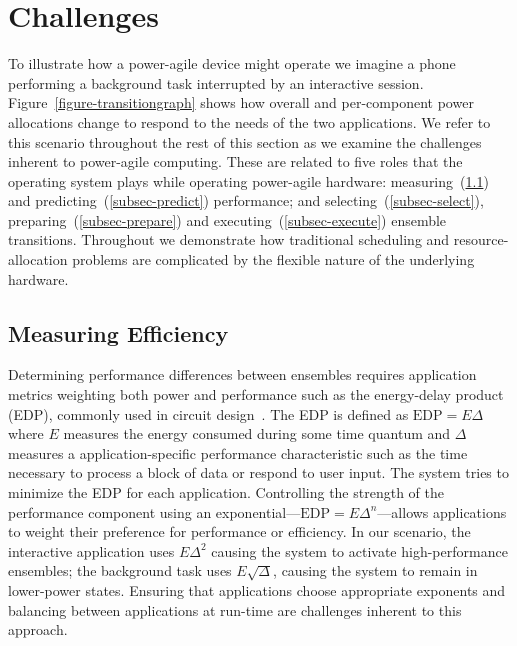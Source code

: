 \section{Challenges}
\label{sec-challenges}



To illustrate how a power-agile device might operate we imagine a phone
performing a background task interrupted by an interactive session.
Figure~\ref{figure-transitiongraph} shows how overall and per-component power
allocations change to respond to the needs of the two applications. We refer
to this scenario throughout the rest of this section as we examine the
challenges inherent to power-agile computing. These are related to five roles
that the operating system plays while operating power-agile hardware:
measuring~(\ref{subsec-measure}) and predicting~(\ref{subsec-predict})
performance; and selecting~(\ref{subsec-select}),
preparing~(\ref{subsec-prepare}) and executing~(\ref{subsec-execute})
ensemble transitions. Throughout we demonstrate how traditional scheduling
and resource-allocation problems are complicated by the flexible nature of
the underlying hardware.

\subsection{Measuring Efficiency}
\label{subsec-measure}

Determining performance differences between ensembles requires application
metrics weighting both power and performance such as the energy-delay product
(EDP), commonly used in circuit design~\cite{martin-et2}. The EDP is defined
as $\textrm{EDP} = E\Delta$ where $E$ measures the energy consumed during
some time quantum and $\Delta$ measures a application-specific performance
characteristic such as the time necessary to process a block of data or
respond to user input. The system tries to minimize the EDP for each
application. Controlling the strength of the performance component using an
exponential---$\textrm{EDP} = E\Delta^n$---allows applications to weight
their preference for performance or efficiency. In our scenario, the
interactive application uses $E\Delta^2$ causing the system to activate
high-performance ensembles; the background task uses $E\sqrt{\Delta}$,
causing the system to remain in lower-power states. Ensuring that
applications choose appropriate exponents and balancing between applications
at run-time are challenges inherent to this approach.

